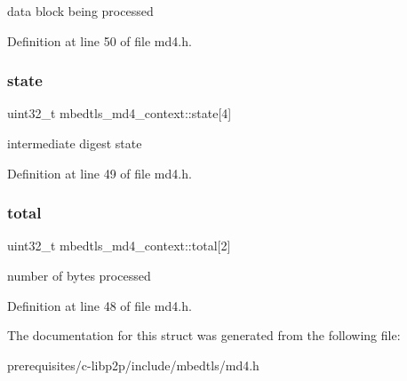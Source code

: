 data block being processed 

Definition at line 50 of file md4.\+h.

\mbox{\label{structmbedtls__md4__context_afe9a40acdd5470eebce1b98f9379322e}} 
\subsubsection{\texorpdfstring{state}{state}}
{\footnotesize\ttfamily uint32\+\_\+t mbedtls\+\_\+md4\+\_\+context\+::state\mbox{[}4\mbox{]}}

intermediate digest state 

Definition at line 49 of file md4.\+h.

\mbox{\label{structmbedtls__md4__context_afabfb5a783d0033a857a375199bf38cc}} 
\subsubsection{\texorpdfstring{total}{total}}
{\footnotesize\ttfamily uint32\+\_\+t mbedtls\+\_\+md4\+\_\+context\+::total\mbox{[}2\mbox{]}}

number of bytes processed 

Definition at line 48 of file md4.\+h.



The documentation for this struct was generated from the following file\+:\begin{DoxyCompactItemize}
\item 
prerequisites/c-\/libp2p/include/mbedtls/md4.\+h\end{DoxyCompactItemize}
